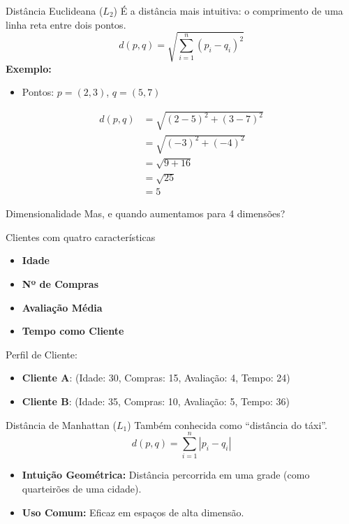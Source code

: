 \documentclass{beamer}
\begin{document}
\begin{frame}{Distância Euclideana {($L_2$)}}
    É a distância mais intuitiva: o comprimento de uma linha reta entre dois pontos.
    \begin{equation}
        d(p, q) = \sqrt{\sum_{i=1}^{n} (p_i - q_i)^2}
    \end{equation}
\pause
\textbf{Exemplo:}
\begin{itemize}
    \item Pontos: $p = (2, 3)$, $q = (5, 7)$
\end{itemize}
\pause
\begin{align*}
    d(p, q) &= \sqrt{(2 - 5)^2 + (3 - 7)^2}\\
    &= \sqrt{(-3)^2 + (-4)^2}\\ &= \sqrt{9 + 16}\\ &= \sqrt{25} \\&= 5
\end{align*}


\end{frame}
\begin{frame}{Dimensionalidade}
\centering
    Mas, e quando aumentamos para 4 dimensões?
\end{frame}
\begin{frame}{Clientes com quatro características}
    
\begin{itemize}
    \item \textbf{Idade}
    \item \textbf{Nº de Compras}
    \item \textbf{Avaliação Média} 
    \item \textbf{Tempo como Cliente} 
\end{itemize}

Perfil de Cliente:
\begin{itemize}
    \item \textbf{Cliente A}: (Idade: 30, Compras: 15, Avaliação: 4, Tempo: 24)
    \item \textbf{Cliente B}: (Idade: 35, Compras: 10, Avaliação: 5, Tempo: 36)
\end{itemize}


\end{frame}
\begin{frame}{Distância de Manhattan ($L_1$)}
    Também conhecida como ``distância do táxi''.
     \[d(p, q) = \sum_{i=1}^{n} |p_i - q_i|\]
    
    \begin{itemize}
        \item \textbf{Intuição Geométrica:} Distância percorrida em uma grade (como quarteirões de uma cidade).
        \item \textbf{Uso Comum:} Eficaz em espaços de alta dimensão.
    \end{itemize}
\end{frame}
\end{document}

